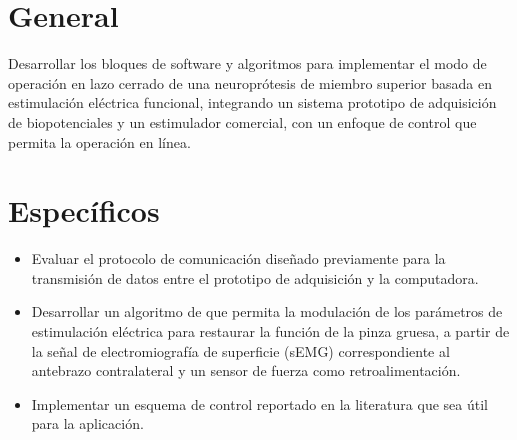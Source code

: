 \section{General}
Desarrollar los bloques de software y algoritmos para implementar el modo de operación en lazo cerrado de una neuroprótesis de miembro superior basada en estimulación eléctrica funcional, integrando un sistema prototipo de adquisición de biopotenciales y un estimulador comercial, con un enfoque de control que permita la operación en línea.

\section{Específicos}

\begin{itemize}
	\item Evaluar el protocolo de comunicación diseñado previamente para la transmisión de datos entre el prototipo de adquisición y la computadora.
	\item Desarrollar un algoritmo de que permita la modulación de los parámetros de estimulación eléctrica para restaurar la función de la pinza gruesa, a partir de la señal de electromiografía de superficie (sEMG) correspondiente al antebrazo contralateral y un sensor de fuerza como retroalimentación.
	\item Implementar un esquema de control reportado en la literatura que sea útil para la aplicación.
\end{itemize}